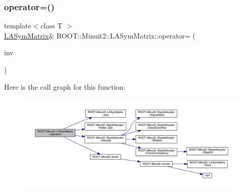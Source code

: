 \subsubsection{\texorpdfstring{operator=()}{operator=()}\hspace{0.1cm}{\footnotesize\ttfamily [11/14]}}
{\footnotesize\ttfamily template$<$class T $>$ \\
\mbox{\hyperlink{classROOT_1_1Minuit2_1_1LASymMatrix}{L\+A\+Sym\+Matrix}}\& R\+O\+O\+T\+::\+Minuit2\+::\+L\+A\+Sym\+Matrix\+::operator= (\begin{DoxyParamCaption}\item[{const \mbox{\hyperlink{classROOT_1_1Minuit2_1_1ABObj}{A\+B\+Obj}}$<$ \mbox{\hyperlink{classROOT_1_1Minuit2_1_1sym}{sym}}, \mbox{\hyperlink{classROOT_1_1Minuit2_1_1MatrixInverse}{Matrix\+Inverse}}$<$ \mbox{\hyperlink{classROOT_1_1Minuit2_1_1sym}{sym}}, \mbox{\hyperlink{classROOT_1_1Minuit2_1_1ABObj}{A\+B\+Obj}}$<$ \mbox{\hyperlink{classROOT_1_1Minuit2_1_1sym}{sym}}, \mbox{\hyperlink{classROOT_1_1Minuit2_1_1LASymMatrix}{L\+A\+Sym\+Matrix}}, T $>$, T $>$, T $>$ \&}]{inv }\end{DoxyParamCaption})\hspace{0.3cm}{\ttfamily [inline]}}

Here is the call graph for this function\+:
\nopagebreak
\begin{figure}[H]
\begin{center}
\leavevmode
\includegraphics[width=350pt]{d3/d72/classROOT_1_1Minuit2_1_1LASymMatrix_a95fd77b55f726095a231817852fceb7d_cgraph}
\end{center}
\end{figure}
\mbox{\label{classROOT_1_1Minuit2_1_1LASymMatrix_a95fd77b55f726095a231817852fceb7d}} 
